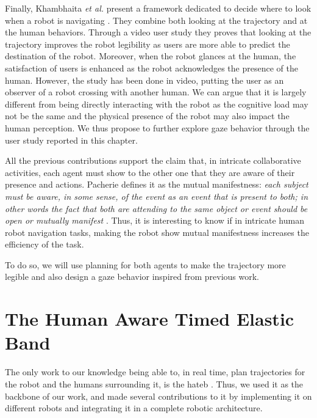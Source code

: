 \documentclass[a4paper,11pt,twoside]{StyleThese}
\begin{document}
Finally, Khambhaita \textit{et al.} present a framework dedicated to decide where to look when a robot is navigating \cite{khambhaita_head-body_2016}. They combine both looking at the trajectory and at the human behaviors. Through a video user study they proves that looking at the trajectory improves the robot legibility as users are more able to predict the destination of the robot. Moreover, when the robot glances at the human, the satisfaction of users is enhanced as the robot acknowledges the presence of the human. However, the study has been done in video, putting the user as an observer of a robot crossing with another human. We can argue that it is largely different from being directly interacting with the robot as the cognitive load may not be the same and the physical presence of the robot may also impact the human perception. We thus propose to further explore gaze behavior through the user study reported in this chapter.

All the previous contributions support the claim that, in intricate collaborative activities, each agent must show to the other one that they are aware of their presence and actions. Pacherie defines it as the mutual manifestness: \textit{each subject must be aware, in some sense, of the event as an event that is present to both; in other words the fact that both are attending to the same object or event should be open or mutually manifest} \cite{pacherie_phenomenology_2011}. Thus, it is interesting to know if in intricate human robot navigation tasks, making the robot show mutual manifestness increases the efficiency of the task.

To do so, we will use planning for both agents to make the trajectory more legible and also design a gaze behavior inspired from previous work.



\section{The Human Aware Timed Elastic Band}
The only work to our knowledge being able to, in real time, plan trajectories for the robot and the humans surrounding it, is the \acrfull{hateb} \cite{khambhaita_viewing_2017}. Thus, we used it as the backbone of our work, and made several contributions to it by implementing it on different robots and integrating it in a complete robotic architecture.
\end{document}
